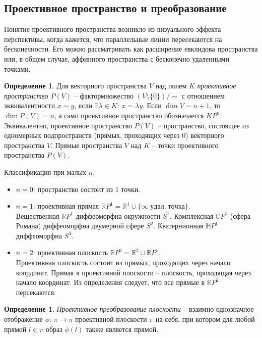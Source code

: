 \documentclass[12pt]{article}
\theoremstyle{definition}
\newtheorem{defin}[theorem]{Определение}
\begin{document}
\subsection{Проективное пространство и преобразование}
Понятие проективного пространства возникло из визуального эффекта перспективы, когда кажется, что параллельные линии пересекаются на бесконечности. Его можно рассматривать как расширение евклидова пространства или, в общем случае, аффинного пространства с бесконечно удаленными точками.
\begin{defin}
Для векторного пространства $V$ над полем $K$ \textit{проективное пространство $P(V)$} -- фактормножество $(V\setminus\{0\})/\sim$ с отношением эквивалентности $x\sim y$, если $\exists\lambda\in K$: $x = \lambda y$. Если $\dim V=n+1$, то $\dim P(V)=n$, а само проективное пространство обозначается $KP^n$.\\
Эквивалентно, проективное пространство $P(V)$ -- пространство, состоящее из одномерных подпространств (прямых, проходящих через 0) векторного пространства $V$. Прямые пространства $V$ над $K$ -- точки проективного пространства $P(V)$.
\end{defin}
Классификация при малых $n$:
\begin{itemize}
    \item $n=0$: пространство состоит из 1 точки.
    \item $n=1$: проективная прямая $\mathbb{R}P^1=\mathbb{R}^1\cup\{\infty\; удал.\; точка\}$.\\ Вещественная $\mathbb{R}P^1$ диффеоморфна окружности $S^1$. Комплексная $\mathbb{C}P^1$ (сфера Римана) диффеоморфна двумерной сфере $S^2$. Кватернионная $\mathbb{H}P^1$ диффеоморфна $S^4$.
    \item $n=2$: проективная плоскость $\mathbb{R}P^2=\mathbb{R}^2\cup\mathbb{R}P^1$.\\
    Проективная плоскость состоит из прямых, проходящих через начало координат. Прямая в проективной плоскости -- плоскость, проходящая через начало координат. Из определения следует, что все прямые в $\mathbb{R}P^2$ персекаются.
\end{itemize}
\begin{defin}
\textit{Проективное преобразование плоскости} -- взаимно-однозначное отображение $\phi$: $\pi \to \pi$ проективной плоскости $\pi$  на себя, при котором для любой прямой $l\in \pi$  образ $\phi(l)$ также является прямой.
\end{defin}
\end{document}
